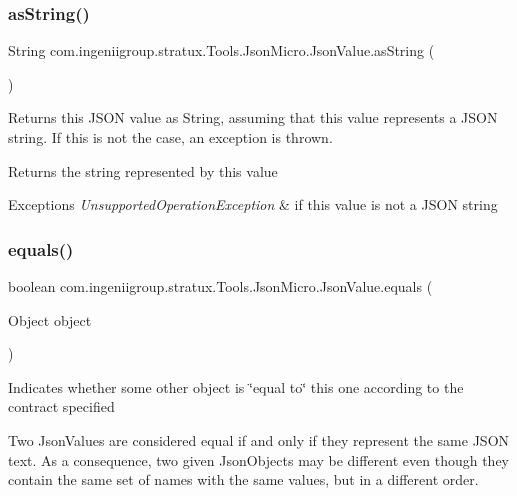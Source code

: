 \subsubsection{\texorpdfstring{as\+String()}{asString()}}
{\footnotesize\ttfamily String com.\+ingeniigroup.\+stratux.\+Tools.\+Json\+Micro.\+Json\+Value.\+as\+String (\begin{DoxyParamCaption}{ }\end{DoxyParamCaption})}

Returns this J\+S\+ON value as String, assuming that this value represents a J\+S\+ON string. If this is not the case, an exception is thrown.

\begin{DoxyReturn}{Returns}
the string represented by this value 
\end{DoxyReturn}

\begin{DoxyExceptions}{Exceptions}
{\em Unsupported\+Operation\+Exception} & if this value is not a J\+S\+ON string \\
\hline
\end{DoxyExceptions}
\mbox{\label{classcom_1_1ingeniigroup_1_1stratux_1_1_tools_1_1_json_micro_1_1_json_value_a3296df6eea6d3ed3841c3b208ecfa415}} 
\subsubsection{\texorpdfstring{equals()}{equals()}}
{\footnotesize\ttfamily boolean com.\+ingeniigroup.\+stratux.\+Tools.\+Json\+Micro.\+Json\+Value.\+equals (\begin{DoxyParamCaption}\item[{Object}]{object }\end{DoxyParamCaption})}

Indicates whether some other object is \char`\"{}equal to\char`\"{} this one according to the contract specified

Two Json\+Values are considered equal if and only if they represent the same J\+S\+ON text. As a consequence, two given Json\+Objects may be different even though they contain the same set of names with the same values, but in a different order. 


